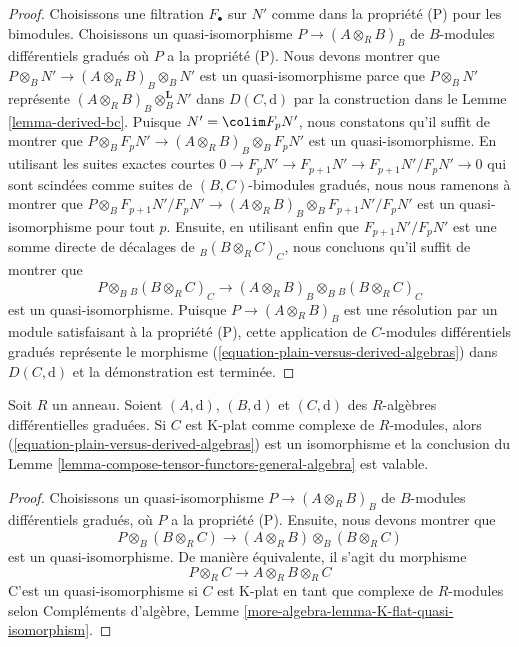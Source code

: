 \begin{proof}
\medskip\noindent
Choisissons une filtration $F_\bullet$ sur $N'$ comme dans la propriété (P) pour
les bimodules. Choisissons un quasi-isomorphisme $P \to (A \otimes_R B)_B$ de
$B$-modules différentiels gradués où $P$ a la propriété (P). Nous devons montrer
que $P \otimes_B N' \to (A \otimes_R B)_B \otimes_B N'$ est un quasi-isomorphisme
parce que $P \otimes_B N'$ représente $(A \otimes_R B)_B \otimes_B^\mathbf{L} N'$
dans $D(C, \text{d})$ par la construction dans le Lemme \ref{lemma-derived-bc}. Puisque
$N' = \colim F_pN'$, nous constatons qu'il suffit de montrer que $P
\otimes_B F_pN' \to (A \otimes_R B)_B \otimes_B F_pN'$ est un quasi-isomorphisme.
En utilisant les suites exactes courtes $0 \to F_pN' \to F_{p + 1}N' \to F_{p +
1}N'/F_pN' \to 0$
qui sont scindées comme suites de $(B, C)$-bimodules gradués, nous nous ramenons à montrer
que $P \otimes_B F_{p + 1}N'/F_pN' \to (A \otimes_R B)_B \otimes_B F_{p +
1}N'/F_pN'$ est un quasi-isomorphisme pour tout $p$. Ensuite, en utilisant enfin
que $F_{p + 1}N'/F_pN'$ est une somme directe de décalages de ${}_B(B \otimes_R
C)_C$, nous concluons qu'il suffit de montrer que
$$
P \otimes_B {}_B(B \otimes_R C)_C \to
(A \otimes_R B)_B \otimes_B {}_B(B \otimes_R C)_C
$$
est un quasi-isomorphisme. Puisque $P \to (A \otimes_R B)_B$ est une résolution
par un module satisfaisant à la propriété (P), cette application de $C$-modules
différentiels gradués représente le morphisme
(\ref{equation-plain-versus-derived-algebras}) dans $D(C, \text{d})$ et la
démonstration est terminée.
\end{proof}

\begin{lemma}
\label{lemma-compose-tensor-functors}
Soit $R$ un anneau. Soient $(A, \text{d})$, $(B, \text{d})$ et $(C, \text{d})$ des
$R$-algèbres différentielles graduées. Si $C$ est K-plat comme complexe de
$R$-modules, alors (\ref{equation-plain-versus-derived-algebras}) est un
isomorphisme et la conclusion du Lemme
\ref{lemma-compose-tensor-functors-general-algebra} est valable.
\end{lemma}

\begin{proof}
Choisissons un quasi-isomorphisme $P \to (A \otimes_R B)_B$ de $B$-modules différentiels
gradués, où $P$ a la propriété (P). Ensuite, nous devons montrer que
$$
P \otimes_B (B \otimes_R C) \longrightarrow
(A \otimes_R B) \otimes_B (B \otimes_R C)
$$
est un quasi-isomorphisme. De manière équivalente, il s'agit du morphisme
$$
P \otimes_R C \longrightarrow
A \otimes_R B \otimes_R C
$$
C'est un quasi-isomorphisme si $C$ est K-plat en tant que complexe de $R$-modules
selon Compléments d'algèbre, Lemme
\ref{more-algebra-lemma-K-flat-quasi-isomorphism}.
\end{proof}





